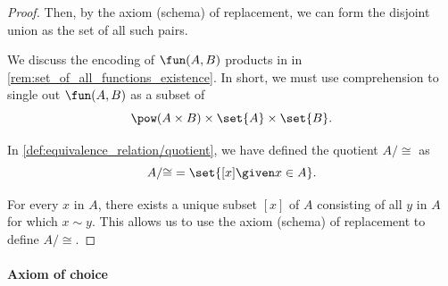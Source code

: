\begin{proof}
  Then, by the axiom (schema) of replacement, we can form the disjoint union as the set of all such pairs.

   We discuss the encoding of \( \fun(A, B) \) products in  in \cref{rem:set_of_all_functions_existence}. In short, we must use comprehension to single out \( \fun(A, B) \) as a subset of
  \begin{equation*}
    \pow(A \times B) \times \set{ A } \times \set{ B }.
  \end{equation*}

   In \cref{def:equivalence_relation/quotient}, we have defined the quotient \( A / {\cong} \) as
  \begin{equation*}
    A / {\cong} = \set{ [x] \given x \in A }.
  \end{equation*}

  For every \( x \) in \( A \), there exists a unique subset \( [x] \) of \( A \) consisting of all \( y \) in \( A \) for which \( x \sim y \). This allows us to use the axiom (schema) of replacement to define \( A / {\cong} \).
\end{proof}

\paragraph{Axiom of choice}

